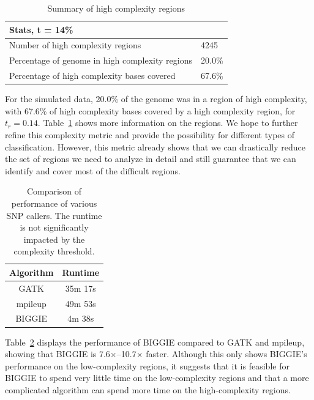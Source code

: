 \documentclass[10pt]{article}
\begin{document}
\begin{table}[tb]
  \centering
  \small
  \begin{tabular}{| p{5cm} | p{0.8cm} |}
    \hline
    Stats, t = 14\% & \\
    \hline
    Number of high complexity regions & 4245 \\
    Percentage of genome in high complexity regions & 20.0\% \\
    Percentage of high complexity bases covered & 67.6\% \\
    \hline
  \end{tabular}
  \caption{Summary of high complexity regions}
  \label{tab:complexity}
\end{table}


For the simulated data, 20.0\% of the genome was in a region of high complexity, with 67.6\% of high complexity bases covered by a high complexity region, for $t_r =0.14$. 
Table~\ref{tab:complexity} shows more information on the regions.
We hope to further refine this complexity metric and provide the possibility for different types
of classification.  However, this metric already shows that we can drastically
reduce the set of regions we need to analyze in detail and still guarantee that we can identify and cover most of the difficult regions.

\begin{table}[tb]
  \centering
  \small
  \begin{tabular}{| c | c |}
    \hline
    Algorithm & Runtime \\
    \hline
    GATK & 35m 17s \\
    mpileup & 49m 53s \\
    BIGGIE & 4m 38s \\
    \hline
  \end{tabular}
  \caption{Comparison of performance of various SNP callers. The runtime is not significantly impacted by the complexity threshold.}
  \label{tab:performance}
\end{table}

Table~\ref{tab:performance} displays the performance of BIGGIE compared to GATK and mpileup, showing that BIGGIE is 7.6$\times$--10.7$\times$ faster.
Although this only shows BIGGIE's performance on the low-complexity regions, it suggests that it is feasible for BIGGIE to spend very little time on the low-complexity regions and that a more complicated algorithm can spend more time on the high-complexity regions.
\end{document}
